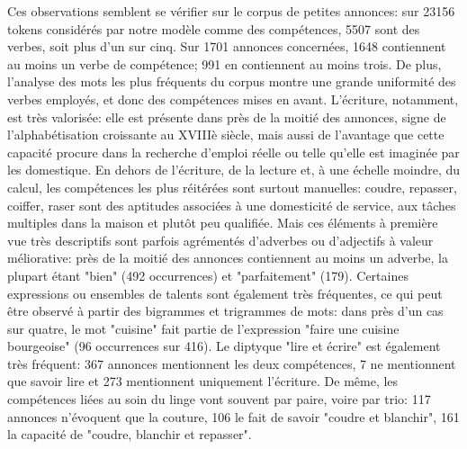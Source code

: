 Ces observations semblent se vérifier sur le corpus de petites annonces: sur 23156 tokens considérés par notre modèle comme des compétences, 5507 sont des verbes, soit plus d'un sur cinq. Sur 1701 annonces concernées, 1648 contiennent au moins un verbe de compétence; 991 en contiennent au moins trois.
De plus, l'analyse des mots les plus fréquents du corpus montre une grande uniformité des verbes employés, et donc des compétences mises en avant. L'écriture, notamment, est très valorisée: elle est présente dans près de la moitié des annonces, signe de l'alphabétisation croissante au XVIIIè siècle, mais aussi de l'avantage que cette capacité procure dans la recherche d'emploi réelle ou telle qu'elle est imaginée par les domestique. En dehors de l'écriture, de la lecture et, à une échelle moindre, du calcul, les compétences les plus réitérées sont surtout manuelles: coudre, repasser, coiffer, raser sont des aptitudes associées à une domesticité de service, aux tâches multiples dans la maison et plutôt peu qualifiée. Mais ces éléments à première vue très descriptifs sont parfois agrémentés d'adverbes ou d'adjectifs à valeur méliorative: près de la moitié des annonces contiennent au moins un adverbe, la plupart étant "bien" (492 occurrences) et "parfaitement" (179).
Certaines expressions ou ensembles de talents sont également très fréquentes, ce qui peut être observé à partir des bigrammes et trigrammes de mots: dans près d'un cas sur quatre, le mot "cuisine" fait partie de l'expression "faire une cuisine bourgeoise" (96 occurrences sur 416). Le diptyque "lire et écrire" est également très fréquent: 367 annonces mentionnent les deux compétences, 7 ne mentionnent que savoir lire et 273 mentionnent uniquement l'écriture. De même, les compétences liées au soin du linge vont souvent par paire, voire par trio: 117 annonces n'évoquent que la couture, 106 le fait de savoir "coudre et blanchir", 161 la capacité de "coudre, blanchir et repasser". 


